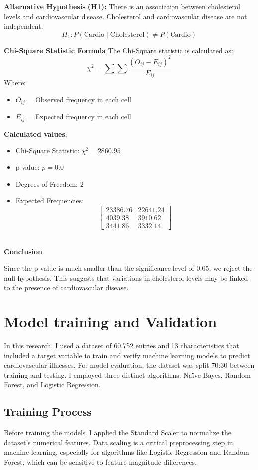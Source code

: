 \documentclass[12pt]{article}
\begin{document}
\textbf{Alternative Hypothesis (H1):} There is an association between cholesterol levels and cardiovascular disease. Cholesterol and cardiovascular disease are not independent.
\[
H_1: P(\text{Cardio} \mid \text{Cholesterol}) \neq P(\text{Cardio})
\]

\textbf{Chi-Square Statistic Formula}
The Chi-Square statistic is calculated as:
\[
\chi^2 = \sum \sum \frac{(O_{ij} - E_{ij})^2}{E_{ij}}
\]
Where:
\begin{itemize}
    \item \( O_{ij} \) = Observed frequency in each cell
    \item \( E_{ij} \) = Expected frequency in each cell
\end{itemize}

\textbf{Calculated values}:
\begin{itemize}
    \item Chi-Square Statistic: \( \chi^2 = 2860.95 \)
    \item p-value: \( p = 0.0 \)
    \item Degrees of Freedom: \( 2 \)
    \item Expected Frequencies: 
    \[
    \begin{bmatrix}
    23386.76 & 22641.24 \\
    4039.38 & 3910.62 \\
    3441.86 & 3332.14
    \end{bmatrix}
    \]
\end{itemize}
\\
\textbf{Conclusion}

Since the p-value is much smaller than the significance level of 0.05, we reject the null hypothesis. This suggests that variations in cholesterol levels may be linked to the presence of cardiovascular disease.

\section{Model training and Validation}
In this research, I used a dataset of 60,752 entries and 13 characteristics that included a target variable to train and verify machine learning models to predict cardiovascular illnesses. For model evaluation, the dataset was split 70:30 between training and testing. I employed three distinct algorithms: Naïve Bayes, Random Forest, and Logistic Regression.
\subsection{Training Process}
Before training the models, I applied the Standard Scaler to normalize the dataset's numerical features. Data scaling is a critical preprocessing step in machine learning, especially for algorithms like Logistic Regression and Random Forest, which can be sensitive to feature magnitude differences.
\end{document}
